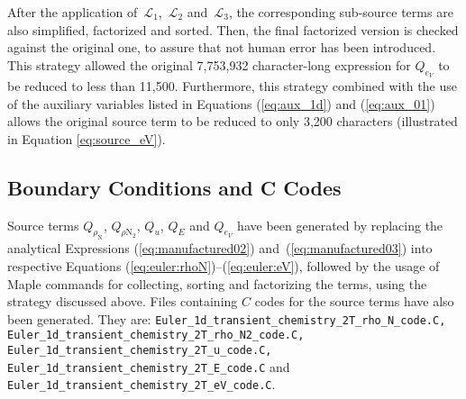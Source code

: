 \documentclass[10pt]{article}
\newcommand{\Lo}{\,\mathcal{L}}
\begin{document}
After the application of $\Lo_1$,  $\Lo_2$ and $\Lo_3$, the corresponding sub-source terms are also simplified, factorized and sorted. Then, the final factorized version is checked against the original one, to assure that not human error has been introduced.  This strategy  allowed the original  7,753,932 character-long  expression for $Q_{e_V}$ to be reduced to less than 11,500. Furthermore, this strategy combined with the use of the auxiliary variables listed in Equations (\ref{eq:aux_1d}) and (\ref{eq:aux_01}) allows the original source term to be reduced to only 3,200 characters (illustrated in Equation \ref{eq:source_eV}).


\subsection{Boundary Conditions and C Codes}
Source terms $Q_{\rho_\text{N} }$, $Q_{\rho \text{N}_{2}}$, $Q_u$, $Q_E$ and $Q_{e_V}$ have been generated by replacing the analytical Expressions (\ref{eq:manufactured02}) and~(\ref{eq:manufactured03}) into respective Equations (\ref{eq:euler:rhoN})--(\ref{eq:euler:eV}), followed by the usage of Maple commands for collecting, sorting and factorizing the terms, using the strategy discussed above. Files containing $C$ codes for the source terms have also been generated. They are: \texttt{Euler\_1d\_transient\_chemistry\_2T\_rho\_N\_code.C, Euler\_1d\_transient\_chemistry\_2T\_rho\_N2\_code.C, Euler\_1d\_transient\_chemistry\_2T\_u\_code.C,\\ Euler\_1d\_transient\_chemistry\_2T\_E\_code.C} and \texttt{Euler\_1d\_transient\_chemistry\_2T\_eV\_code.C}.
\end{document}

